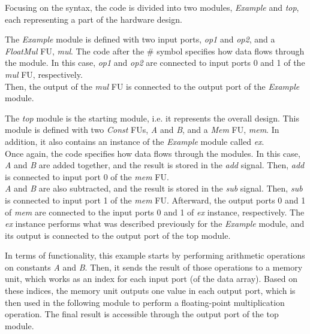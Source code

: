 Focusing on the syntax, the code is divided into two modules, \textit{Example} and \textit{top}, each representing a part of the hardware design.

The \textit{Example} module is defined with two input ports, \textit{op1} and \textit{op2}, and a \textit{FloatMul} FU, \textit{mul}. 
The code after the \# symbol specifies how data flows through the module. In this case, \textit{op1} and \textit{op2} are connected to input ports 0 and 1 of the \textit{mul} FU, respectively. \\
Then, the output of the \textit{mul} FU is connected to the output port of the \textit{Example} module.

The \textit{top} module is the starting module, i.e. it represents the overall design.
This module is defined with two \textit{Const} FUs, \textit{A} and \textit{B}, and a \textit{Mem} FU, \textit{mem}. In addition, it also contains an instance of the \textit{Example} module called \textit{ex}.\\
Once again, the code specifies how data flows through the modules. In this case, \textit{A} and \textit{B} are added together, and the result is stored in the \textit{add} signal. Then, \textit{add} is connected to input port 0 of the \textit{mem} FU.\\
\textit{A} and \textit{B} are also subtracted, and the result is stored in the \textit{sub} signal. Then, \textit{sub} is connected to input port 1 of the \textit{mem} FU.
Afterward, the output ports 0 and 1 of \textit{mem} are connected to the input ports 0 and 1 of \textit{ex} instance, respectively. 
The \textit{ex} instance performs what was described previously for the \textit{Example} module, and its output is connected to the output port of the top module.

In terms of functionality, this example starts by performing arithmetic operations on constants \textit{A} and \textit{B}. Then, it sends the result of those operations to a memory unit, which works as an index for each input port (of the data array). Based on these indices, the memory unit outputs one value in each output port, which is then used in the following module to perform a floating-point multiplication operation. The final result is accessible through the output port of the top module.